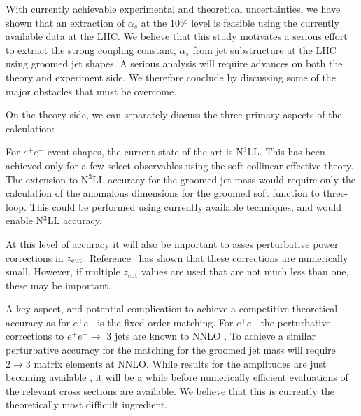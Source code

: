 \documentclass[11pt,letterpaper]{article}
\newcommand{\zcut}{z_{\rm cut}}
\newcommand{\ijm}[1]{\textbf{\textcolor{llblue}{(#1 --ijm)}}}
\begin{document}
With currently achievable experimental and theoretical uncertainties, we have shown that an extraction of $\alpha_s$ at the $10\%$ level is feasible using the currently available data at the LHC.  We believe that this study motivates a serious effort to extract the strong coupling constant, $\alpha_s$ from jet substructure at the LHC using groomed jet shapes. A serious analysis will require advances on both the theory and experiment side. We therefore conclude by discussing some of the major obstacles that must be overcome.



On the theory side, we can separately discuss the three primary aspects of the calculation:

\vspace{5mm}

 For $e^+e^-$ event shapes, the current state of the art is N$^3$LL. This has been achieved only for a few select observables using the soft collinear effective theory. The extension  to N$^3$LL accuracy for the groomed jet mass would require only the calculation of the anomalous dimensions for the groomed soft function to three-loop. This could be performed using currently available techniques, and would enable N$^3$LL accuracy. 

At this level of accuracy it will also be important to asses perturbative power corrections in $\zcut$.  Reference~\cite{Marzani:2017kqd,Marzani:2017mva} has shown that these corrections are numerically small.  However, if multiple $z_\text{cut}$ values are used that are not much less than one, these may be important.

\vspace{5mm}

 A key aspect, and potential complication to achieve a competitive theoretical accuracy as for $e^+e^-$ is the fixed order matching. For $e^+e^-$  the perturbative corrections to $e^+e^- \to$ 3 jets are known to NNLO \cite{GehrmannDeRidder:2007hr,Gehrmann-DeRidder:2007nzq,Weinzierl:2008iv,Weinzierl:2009ms}. To achieve a similar perturbative accuracy for the matching for the groomed jet mass will require $2\to 3$ matrix elements at NNLO. While results for the amplitudes are just becoming available \cite{Gehrmann:2015bfy,Dunbar:2016aux,Badger:2013yda,Badger:2017jhb,Abreu:2017hqn}, it will be a while before numerically efficient evaluations of the relevant cross sections are available. We believe that this is currently the theoretically most difficult ingredient. 
\end{document}
